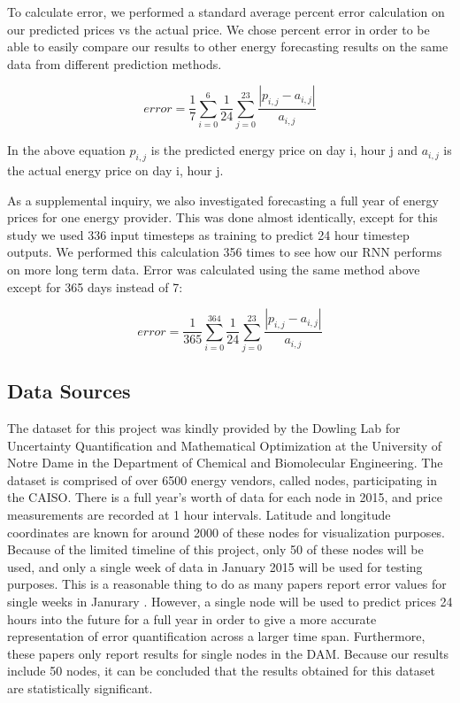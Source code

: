 \documentclass[sigconf]{acmart}
\begin{document}
To calculate error, we performed a standard average percent error calculation on our predicted prices vs the actual price. We chose percent error in order to be able to easily compare our results to other energy forecasting results on the same data from different prediction methods.

$$ error = \frac{1}{7}\sum_{i=0}^{6}\frac{1}{24}\sum_{j=0}^{23}\frac{|p_{i,j}-a_{i,j}|}{a_{i,j}}$$

In the above equation $p_{i,j}$ is the predicted energy price on day i, hour j and $a_{i,j}$ is the actual energy price on day i, hour j.

As a supplemental inquiry, we also investigated forecasting a full year of energy prices for one energy provider. This was done almost identically, except for this study we used 336 input timesteps as training to predict 24 hour timestep outputs. We performed this calculation 356 times to see how our RNN performs on more long term data. Error was calculated using the same method above except for 365 days instead of 7:

$$ error = \frac{1}{365}\sum_{i=0}^{364}\frac{1}{24}\sum_{j=0}^{23}\frac{|p_{i,j}-a_{i,j}|}{a_{i,j}}$$


\subsection{Data Sources}
The dataset for this project was kindly provided by the Dowling Lab for Uncertainty Quantification and Mathematical Optimization at the University of Notre Dame in the Department of Chemical and Biomolecular Engineering. The dataset is comprised of over 6500 energy vendors, called nodes, participating in the CAISO. There is a full year's worth of data for each node in 2015, and price measurements are recorded at 1 hour intervals. Latitude and longitude coordinates are known for around 2000 of these nodes for visualization purposes. Because of the limited timeline of this project, only 50 of these nodes will be used, and only a single week of data in January 2015 will be used for testing purposes.  This is a reasonable thing to do as many papers report error values for single weeks in Janurary \cite{Conejo2005a,Garcia2005,Tan2010}. However, a single node will be used to predict prices 24 hours into the future for a full year in order to give a more accurate representation of error quantification across a larger time span. Furthermore, these papers only report results for single nodes in the DAM. Because our results include 50 nodes, it can be concluded that the results obtained for this dataset are statistically significant. 
\end{document}
